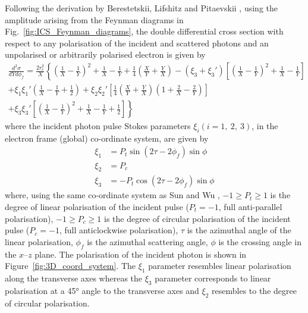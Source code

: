 \documentclass[../main.tex]{subfiles}
\begin{document}
Following the derivation by Berestetskii, Lifshitz and Pitaevskii \cite{berestetskii1982quantum}, using the amplitude arising from the Feynman diagrams in Fig.~\ref{fig:ICS_Feynman_diagrams}, the double differential cross section with respect to any polarisation of the incident and scattered photons and an unpolarised or arbitrarily polarised electron is given by 
\begin{multline}
\frac{d^{2}\sigma}{dYd\phi_{f}} = \frac{2r_{e}^{2}}{X}\left\{\left(\frac{1}{X}-\frac{1}{Y}\right)^{2}+\frac{1}{X}-\frac{1}{Y}+\frac{1}{4}\left(\frac{X}{Y}+\frac{Y}{X}\right)  -\left(\xi_{3}+\xi_{3}'\right)\left[\left(\frac{1}{X}-\frac{1}{Y}\right)^{2}+\frac{1}{X}-\frac{1}{Y}\right] \right.\\\left. +\xi_{1}\xi_{1}'\left(\frac{1}{X}-\frac{1}{Y}+\frac{1}{2}\right) + \xi_{2}\xi_{2}'\left[\frac{1}{4}\left(\frac{X}{Y}+\frac{Y}{X}\right)\left(1+\frac{2}{X}-\frac{2}{Y}\right)\right] \right.\\\left. + \xi_{3}\xi_{3}'\left[\left(\frac{1}{X}-\frac{1}{Y}\right)^{2}+\frac{1}{X}-\frac{1}{Y}+\frac{1}{2}\right] \right\}
\label{eq:polarisation_differential_cross_section}    
\end{multline}
where the incident photon pulse Stokes parameters $\xi_{i} \left(i=1,~2,~3\right)$, in the electron frame (global) co-ordinate system, are given by
\begin{align}
\xi_{1} &= P_{t}\sin\left(2\tau-2\phi_{f}\right)\sin\phi\\
\xi_{2} &= P_{c} \\
\xi_{3} &= -P_{t}\cos\left(2\tau-2\phi_{f}\right)\sin\phi
\label{eq:incident_stokes_parameters}    
\end{align}
where, using the same co-ordinate system as Sun and Wu \cite{sun2009characterizations,sun2011theoretical}, $-1 \geq P_{t} \geq 1$ is the degree of linear polarisation of the incident pulse ($P_{t}=-1$, full anti-parallel polarisation), $-1 \geq P_{c} \geq 1$ is the degree of circular polarisation of the incident pulse ($P_{c}=-1$, full anticlockwise polarisation), $\tau$ is the azimuthal angle of the linear polarisation, $\phi_{f}$ is the azimuthal scattering angle, $\phi$ is the crossing angle in the $x$--$z$ plane. The polarisation of the incident photon is shown in Figure~\ref{fig:3D_coord_system}. The $\xi_{1}$ parameter resembles linear polarisation along the transverse axes whereas the $\xi_{3}$ parameter corresponds to linear polarisation at a 45\si{\degree} angle to the transverse axes and $\xi_{2}$ resembles to the degree of circular polarisation. 
\end{document}
